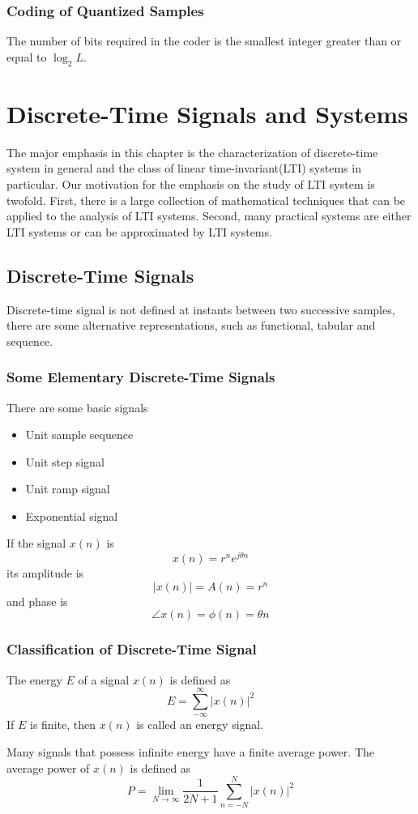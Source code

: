 \documentclass[10pt,a4paper,oneside]{article}
\begin{document}
\subsubsection{Coding of Quantized Samples}
The number of bits required in the coder is the smallest integer greater than or equal to $\log_2L$.
\section{Discrete-Time Signals and Systems}
The major emphasis in this chapter is the characterization of discrete-time system in general and the class of linear time-invariant(LTI) systems in particular. Our motivation for the emphasis on the study of LTI system is twofold. First, there is a large collection of mathematical techniques that can be applied to the analysis of LTI systems. Second, many practical systems are either LTI systems or can be approximated by LTI systems.
\subsection{Discrete-Time Signals}
Discrete-time signal is not defined at instants between two successive samples, there are some alternative representations, such as functional, tabular and sequence.
\subsubsection{Some Elementary Discrete-Time Signals}
There are some basic signals
\begin{itemize}
\item Unit sample sequence
\item Unit step signal
\item Unit ramp signal
\item Exponential signal
\end{itemize}
If the signal $x(n)$ is
\[
x(n) = r^ne^{j\theta n}
\]
its amplitude is
\[
|x(n)| = A(n) = r^n
\]
and phase is
\[
\angle x(n)=\phi(n)=\theta n
\]
\subsubsection{Classification of Discrete-Time Signal}
The energy $E$ of a signal $x(n)$ is defined as
\[
E = \sum_{-\infty}^{\infty}|x(n)|^2
\]
If $E$ is finite, then $x(n)$ is called an energy signal.

Many signals that possess infinite energy have a finite average power. The average power of $x(n)$ is defined as
\[
P=\lim\limits_{N\rightarrow\infty}\frac{1}{2N+1}\sum_{n=-N}^{N}|x(n)|^2
\]
\end{document}

